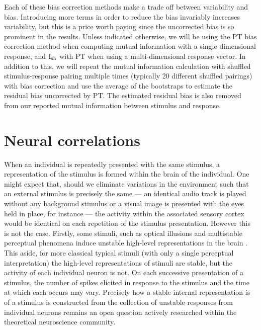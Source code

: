 Each of these bias correction methods make a trade off between variability and bias.
Introducing more terms in order to reduce the bias invariably increases variability, but this is a price worth paying since the uncorrected bias is so prominent in the results.
Unless indicated otherwise, we will be using the \ac{PT} bias correction method when computing mutual information with a single dimensional response, and $\operatorname{I}_{\text{sh}}$ with \ac{PT} when using a multi-dimensional response vector.
In addition to this, we will repeat the mutual information calculation with shuffled stimulus-response pairing multiple times (typically 20 different shuffled pairings) with bias correction and use the average of the bootstraps to estimate the residual bias uncorrected by \ac{PT}.
The estimated residual bias is also removed from our reported mutual information between stimulus and response.


\section{Neural correlations}
\label{sec:bg-corr}

When an individual is repeatedly presented with the same stimulus, a representation of the stimulus is formed within the brain of the individual.
One might expect that, should we eliminate variations in the environment such that an external stimulus is precisely the same --- an identical audio track is played without any background stimulus or a visual image is presented with the eyes held in place, for instance --- the activity within the associated sensory cortex would be identical on each repetition of the stimulus presentation.
However this is not the case.
Firstly, some stimuli, such as optical illusions and multistable perceptual phenomena induce unstable high-level representations in the brain \citep{Lumer1998,Sterzer2009,Watanabe2014}.
This aside, for more classical typical stimuli (with only a single perceptual interpretation) the high-level representations of stimuli are stable, but the activity of each individual neuron is not.
On each successive presentation of a stimulus, the number of spikes elicited in response to the stimulus and the time at which each occurs may vary.
Precisely how a stable internal representation is of a stimulus is constructed from the collection of unstable responses from individual neurons remains an open question actively researched within the theoretical neuroscience community.


